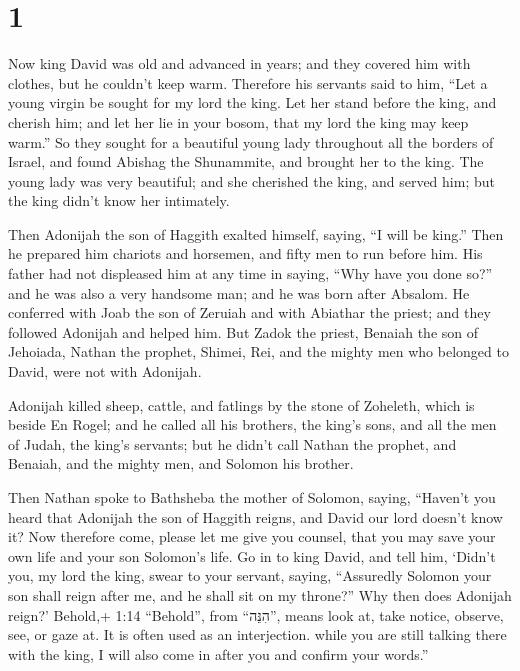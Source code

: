 \hypertarget{section}{%
\section{1}\label{section}}

 Now king David was old and advanced in years; and they
covered him with clothes, but he couldn't keep warm. 
Therefore his servants said to him, ``Let a young virgin be sought for
my lord the king. Let her stand before the king, and cherish him; and
let her lie in your bosom, that my lord the king may keep warm.''
 So they sought for a beautiful young lady throughout all
the borders of Israel, and found Abishag the Shunammite, and brought her
to the king.  The young lady was very beautiful; and she
cherished the king, and served him; but the king didn't know her
intimately.

 Then Adonijah the son of Haggith exalted himself, saying,
``I will be king.'' Then he prepared him chariots and horsemen, and
fifty men to run before him.  His father had not displeased
him at any time in saying, ``Why have you done so?'' and he was also a
very handsome man; and he was born after Absalom.  He
conferred with Joab the son of Zeruiah and with Abiathar the priest; and
they followed Adonijah and helped him.  But Zadok the
priest, Benaiah the son of Jehoiada, Nathan the prophet, Shimei, Rei,
and the mighty men who belonged to David, were not with Adonijah.

 Adonijah killed sheep, cattle, and fatlings by the stone of
Zoheleth, which is beside En Rogel; and he called all his brothers, the
king's sons, and all the men of Judah, the king's servants;
 but he didn't call Nathan the prophet, and Benaiah, and
the mighty men, and Solomon his brother.

 Then Nathan spoke to Bathsheba the mother of Solomon,
saying, ``Haven't you heard that Adonijah the son of Haggith reigns, and
David our lord doesn't know it?  Now therefore come, please
let me give you counsel, that you may save your own life and your son
Solomon's life.  Go in to king David, and tell him, `Didn't
you, my lord the king, swear to your servant, saying, ``Assuredly
Solomon your son shall reign after me, and he shall sit on my throne?''
Why then does Adonijah reign?'  Behold,+ 1:14 ``Behold'',
from ``הִנֵּה'', means look at, take notice, observe, see, or gaze at.
It is often used as an interjection. while you are still talking there
with the king, I will also come in after you and confirm your words.''


